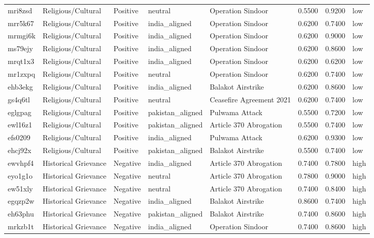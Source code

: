 \begin{longtable}{lllllrrl}
mri8zsd & Religious/Cultural & Positive & neutral & Operation Sindoor & 0.5500 & 0.9200 & low \\
mrr5k67 & Religious/Cultural & Positive & india\_aligned & Operation Sindoor & 0.6200 & 0.7400 & low \\
mrmgi6k & Religious/Cultural & Positive & india\_aligned & Operation Sindoor & 0.6200 & 0.9000 & low \\
ms79ejy & Religious/Cultural & Positive & india\_aligned & Operation Sindoor & 0.6200 & 0.8600 & low \\
mrqt1x3 & Religious/Cultural & Positive & india\_aligned & Operation Sindoor & 0.6200 & 0.6200 & low \\
mr1zxpq & Religious/Cultural & Positive & neutral & Operation Sindoor & 0.6200 & 0.7400 & low \\
ehb3ekg & Religious/Cultural & Positive & india\_aligned & Balakot Airstrike & 0.6200 & 0.8600 & low \\
gs4q6tl & Religious/Cultural & Positive & neutral & Ceasefire Agreement 2021 & 0.6200 & 0.7400 & low \\
eglgpag & Religious/Cultural & Positive & pakistan\_aligned & Pulwama Attack & 0.5500 & 0.7200 & low \\
ewl16z1 & Religious/Cultural & Positive & pakistan\_aligned & Article 370 Abrogation & 0.5500 & 0.7400 & low \\
efs0209 & Religious/Cultural & Positive & india\_aligned & Pulwama Attack & 0.6200 & 0.9300 & low \\
ehcj92x & Religious/Cultural & Positive & pakistan\_aligned & Balakot Airstrike & 0.5500 & 0.7400 & low \\
ewvhpf4 & Historical Grievance & Negative & india\_aligned & Article 370 Abrogation & 0.7400 & 0.7800 & high \\
eyo1g1o & Historical Grievance & Negative & neutral & Article 370 Abrogation & 0.7800 & 0.9000 & high \\
ew51xly & Historical Grievance & Negative & neutral & Article 370 Abrogation & 0.7400 & 0.8400 & high \\
egqzp2w & Historical Grievance & Negative & india\_aligned & Balakot Airstrike & 0.8600 & 0.7400 & high \\
eh63phu & Historical Grievance & Negative & pakistan\_aligned & Balakot Airstrike & 0.7400 & 0.8600 & high \\
mrkzb1t & Historical Grievance & Negative & india\_aligned & Operation Sindoor & 0.7400 & 0.8600 & high \\

\end{longtable}
